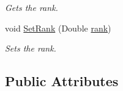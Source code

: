 \begin{DoxyCompactItemize}
\begin{DoxyCompactList}\small\item\em Gets the rank. \end{DoxyCompactList}\item 
void \hyperlink{classcom_1_1shephertz_1_1app42_1_1paas_1_1sdk_1_1csharp_1_1reward_1_1_reward_a3b312c5ec699a8034046f109038c329d}{Set\+Rank} (Double \hyperlink{classcom_1_1shephertz_1_1app42_1_1paas_1_1sdk_1_1csharp_1_1reward_1_1_reward_a9b718d26725b1e122f1929d09dea86b2}{rank})
\begin{DoxyCompactList}\small\item\em Sets the rank. \end{DoxyCompactList}\end{DoxyCompactItemize}
\subsection*{Public Attributes}
